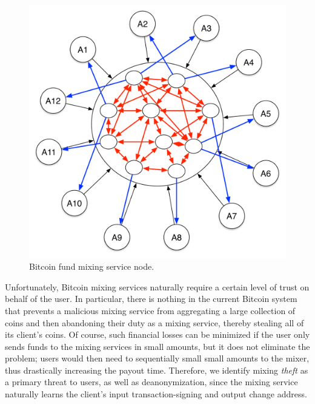 \begin{figure}
\begin{center}
\includegraphics[scale=0.35]{images/mix_bitcoin.pdf}
\caption{Bitcoin fund mixing service node.}
\label{fig:mix-design}
\end{center}
\end{figure}

Unfortunately, Bitcoin mixing services naturally require a certain level of trust on behalf of the user. In particular, there is nothing in the current Bitcoin system that prevents a malicious mixing service from aggregating a large collection of coins and then abandoning their duty as a mixing service, thereby stealing all of its client's coins. Of course, such financial losses can be minimized if the user only sends funds to the mixing services in small amounts, but it does not eliminate the problem; users would then need to sequentially small small amounts to the mixer, thus drastically increasing the payout time. Therefore, we identify mixing \emph{theft} as a primary threat to users, as well as deanonymization, since the mixing service naturally learns the client's input transaction-signing and output change address.

